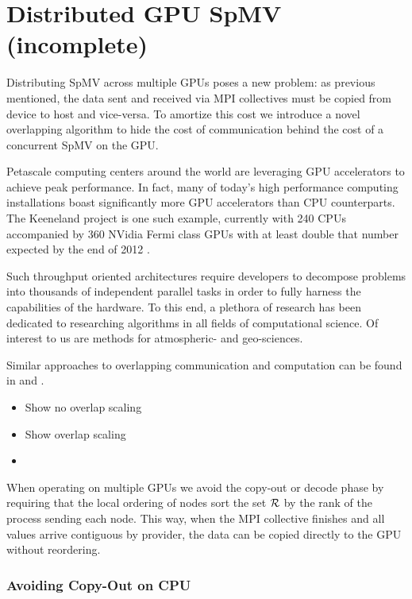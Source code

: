 \documentclass{report}
\begin{document}
\chapter{Distributed GPU SpMV (incomplete)}
\label{chap:multigpu_rbffd}


\cite{Lawlor2009}


Distributing SpMV across multiple GPUs poses a new problem: as previous mentioned, the data sent and received via MPI collectives must be copied from device to host and vice-versa. To amortize this cost we introduce a novel overlapping algorithm to hide the cost of communication behind the cost of a concurrent SpMV on the GPU. 


Petascale computing centers around the world are leveraging GPU accelerators to achieve peak performance. In fact, many of today's high performance computing installations boast significantly more GPU accelerators than CPU counterparts. The Keeneland project is one such example, currently with 240 CPUs accompanied by 360 NVidia Fermi class GPUs with at least double that number expected by the end of 2012 \cite{Vetter2011}. 

Such throughput oriented architectures require developers to decompose problems into thousands of independent parallel tasks in order to fully harness the capabilities of the hardware. To this end, a plethora of research has been dedicated to researching algorithms in all fields of computational science. Of interest to us are methods for atmospheric- and geo-sciences. 


Similar approaches to overlapping communication and computation can be found in \cite{Schubert2011} and \cite{Thibault2009}.

\begin{itemize} 
\item Show no overlap scaling
\item Show overlap scaling
\item 
\end{itemize}

When operating on multiple GPUs we avoid the copy-out or decode phase by requiring that the local ordering of nodes sort the set $\mathcal{R}$ by the rank of the process sending each node. This way, when the MPI collective finishes and all values arrive contiguous by provider, the data can be copied directly to the GPU without reordering.




\subsection{Avoiding Copy-Out on CPU}
\end{document}
